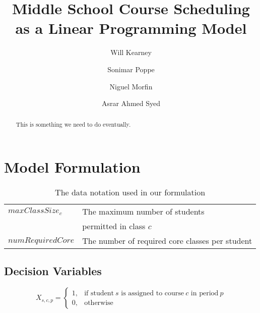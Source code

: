\documentclass[12pt]{article}
\begin{document}
\renewcommand\Authfont{\small}
\renewcommand\Affilfont{\itshape\footnotesize}
\title{Middle School Course Scheduling as a Linear Programming Model}
\author[1]{Will Kearney}
\author[1]{Sonimar Poppe}
\author[2]{Niguel Morfin}
\author[3]{Asrar Ahmed Syed}
\maketitle
\begin{abstract}
This is something we need to do eventually.
\end{abstract}
\section{Model Formulation}


\begin{table}[]
\centering
\caption{The data notation used in our formulation}
\label{tab:data-notation}
\begin{tabular}{ll}
\hline
$maxClassSize_{c}$ & The maximum number of students \\
 & permitted in class $c$ \\
$numRequiredCore$ & The number of required core classes per student \\
\hline
\end{tabular}
\end{table}


\subsection{Decision Variables}

\begin{equation}
	X_{s,c,p} = 
	\begin{cases}
		1, & \text{if student}\ s \text{ is assigned to course}\ c \text{ in period}\ p	\\
		0, & \text{otherwise}
	\end{cases}
\end{equation}
\end{document}
